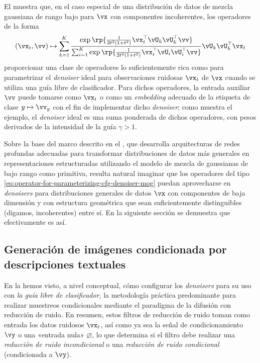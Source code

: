 \documentclass[../../book-main_es.tex]{subfiles}
\begin{document}
El  muestra
que, en el caso especial de
una distribución de datos de mezcla gaussiana de rango bajo para $\vx$ con componentes incoherentes,
los operadores de la forma
\begin{equation}\label{eq:operator-for-parameterizing-cfg-denoiser-mog}
    (\vx_t, \vv) \mapsto
    \sum_{k = 1}^{K}\frac{
        \exp\rp{\frac{1}{2t^{2}(1
        + t^{2})}\vx_t^\top \vU_k \vU_k^\top \vv}
    }
    {
        \sum_{i
        = 1}^{K}\exp\rp{\frac{1}{2t^{2}(1
        + t^{2})}\vx_t^\top \vU_i \vU_i^\top \vv}
    }
    \vU_{k}\vU_{k}^{\top}\vx_t
\end{equation}
proporcionar una clase de operadores lo suficientemente rica como para parametrizar el
\textit{denoiser} ideal para observaciones ruidosas $\vx_t$ de $\vx$ cuando se utiliza
una guía libre de clasificador.
Para dichos operadores,
la entrada auxiliar $\vv$ puede tomarse como $\vx_t$ o como un \textit{embedding} adecuado
de la etiqueta de clase $y \mapsto \vv_y$ con el fin de implementar dicho \textit{denoiser}; como
muestra el ejemplo, el \textit{denoiser} ideal es una suma ponderada de dichos operadores, con
pesos derivados de la intensidad de la guía $\gamma>1$.

Sobre la base del marco descrito en el , que desarrolla arquitecturas de redes profundas
adecuadas para transformar distribuciones de datos más generales en
representaciones estructuradas utilizando el modelo de mezcla de gaussianas de bajo rango como
primitiva, resulta natural imaginar que los operadores del tipo
\eqref{eq:operator-for-parameterizing-cfg-denoiser-mog} puedan aprovecharse en
\textit{denoisers} para
distribuciones generales de datos $\vx$ con componentes de baja dimensión y con estructura geométrica
que sean suficientemente distinguibles (digamos, incoherentes) entre sí.
En la siguiente sección se demuestra que efectivamente es así.

\subsection{Generación de imágenes condicionada por descripciones textuales}\label{sub:text-cond}
En la  hemos visto, a nivel conceptual, cómo configurar los \textit{denoisers} 
para su uso con
\textit{la guía libre de clasificador}, la metodología práctica predominante para
realizar muestreos condicionales mediante el paradigma de la difusión con reducción de ruido.
En resumen, estos filtros de reducción de ruido toman como entrada los datos ruidosos $\vx_t$, así como
ya sea la señal de condicionamiento $\vy$ o una «entrada nula» $\varnothing$,
lo que determina si el filtro debe realizar una \textit{reducción de ruido incondicional} 
o una \textit{reducción de ruido condicional} (condicionada a $\vy$).
\end{document}
